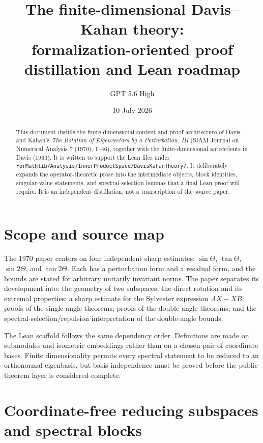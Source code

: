 \documentclass[11pt]{article}
\title{The finite-dimensional Davis--Kahan theory:\\
formalization-oriented proof distillation and Lean roadmap}
\author{GPT 5.6 High}
\date{10 July 2026}
\theoremstyle{remark}
\begin{document}
\maketitle

\begin{abstract}
This document distills the finite-dimensional content and proof architecture of
Davis and Kahan's \emph{The Rotation of Eigenvectors by a Perturbation. III}
(SIAM Journal on Numerical Analysis 7 (1970), 1--46), together with the
finite-dimensional antecedents in Davis (1963).  It is written to support the
Lean files under
\texttt{ForMathlib/Analysis/InnerProductSpace/DavisKahanTheory/}.
It deliberately expands the operator-theoretic prose into the intermediate
objects, block identities, singular-value statements, and spectral-selection
lemmas that a final Lean proof will require.  It is an independent distillation,
not a transcription of the source paper.
\end{abstract}

\tableofcontents

\section{Scope and source map}

The 1970 paper centers on four independent sharp estimates:
\(\sin\Theta\), \(\tan\Theta\), \(\sin 2\Theta\), and
\(\tan 2\Theta\).  Each has a perturbation form and a residual form, and the
bounds are stated for arbitrary unitarily invariant norms.  The paper separates
its development into: the geometry of two subspaces; the direct rotation and
its extremal properties; a sharp estimate for the Sylvester expression
\(AX-XB\); proofs of the single-angle theorems; proofs of the double-angle
theorems; and the spectral-selection/repulsion interpretation of the
double-angle bounds.

The Lean scaffold follows the same dependency order.  Definitions are made on
submodules and isometric embeddings rather than on a chosen pair of coordinate
bases.  Finite dimensionality permits every spectral statement to be reduced to
an orthonormal eigenbasis, but basis independence must be proved before the
public theorem layer is considered complete.

\section{Coordinate-free reducing subspaces and spectral blocks}
\end{document}

